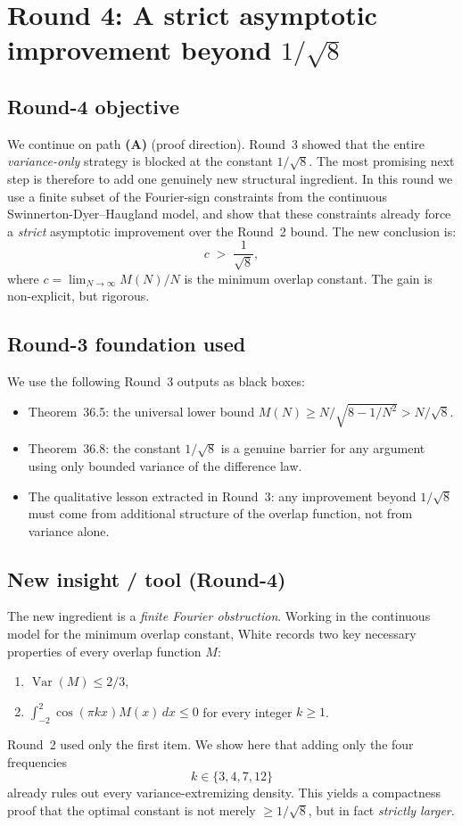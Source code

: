 \section{Round 4: A strict asymptotic improvement beyond $1/\sqrt 8$}

\subsection{Round-4 objective}
We continue on path \textbf{(A)} (proof direction).
Round~3 showed that the entire \emph{variance-only} strategy is blocked at the constant
\(1/\sqrt 8\).
The most promising next step is therefore to add one genuinely new structural ingredient.
In this round we use a finite subset of the Fourier-sign constraints from the continuous
Swinnerton-Dyer--Haugland model, and show that these constraints already force a
\emph{strict} asymptotic improvement over the Round~2 bound.
The new conclusion is:
\[
 c\;>\;\frac{1}{\sqrt 8},
\]
where \(c=\lim_{N\to\infty} M(N)/N\) is the minimum overlap constant.
The gain is non-explicit, but rigorous.

\subsection{Round-3 foundation used}
We use the following Round~3 outputs as black boxes:
\begin{itemize}
\item Theorem~36.5: the universal lower bound \(M(N)\ge N/\sqrt{8-1/N^2}>N/\sqrt 8\).
\item Theorem~36.8: the constant \(1/\sqrt 8\) is a genuine barrier for any argument using only bounded variance of the difference law.
\item The qualitative lesson extracted in Round~3: any improvement beyond \(1/\sqrt 8\) must come from additional structure of the overlap function, not from variance alone.
\end{itemize}

\subsection{New insight / tool (Round-4)}
The new ingredient is a \emph{finite Fourier obstruction}.
Working in the continuous model for the minimum overlap constant, White records two key necessary properties of every overlap function \(M\):
\begin{enumerate}
\item \(\operatorname{Var}(M)\le 2/3\),
\item \(\int_{-2}^{2}\cos(\pi kx)M(x)\,dx\le 0\) for every integer \(k\ge 1\).
\end{enumerate}
Round~2 used only the first item.
We show here that adding only the four frequencies
\[
 k\in\{3,4,7,12\}
\]
already rules out every variance-extremizing density.
This yields a compactness proof that the optimal constant is not merely \(\ge 1/\sqrt 8\), but in fact \emph{strictly larger}.

